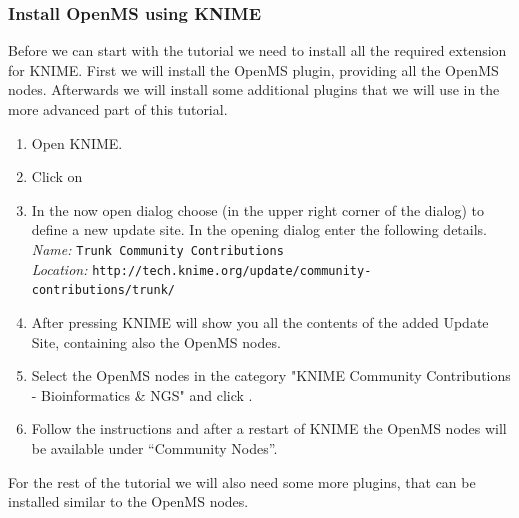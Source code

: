 \subsubsection{Install OpenMS using KNIME}

Before we can start with the tutorial we need to install all the required extension for KNIME.
First we will install the OpenMS plugin, providing all the OpenMS nodes.
Afterwards we will install some additional plugins that we will use in the more advanced part of this tutorial.

\begin{enumerate}
\item Open KNIME.
\item Click on 
\item \label{it:add_site} In the now open dialog choose  (in the upper right corner of the dialog) to define a new update site. In the opening dialog enter the following details. \\
\textit{Name:} \texttt{Trunk Community Contributions} \\
\textit{Location:} \texttt{http://tech.knime.org/update/community-contributions/trunk/}
\item \label{it:select_site} After pressing  KNIME will show you all the contents of the added Update Site, containing also the OpenMS nodes.
\item Select the OpenMS nodes in the category "KNIME Community Contributions - Bioinformatics \& NGS" and click .
\item Follow the instructions and after a restart of KNIME the OpenMS nodes will be available under “Community Nodes”.
\end{enumerate}


For the rest of the tutorial we will also need some more plugins, that can be installed similar to the OpenMS nodes.

